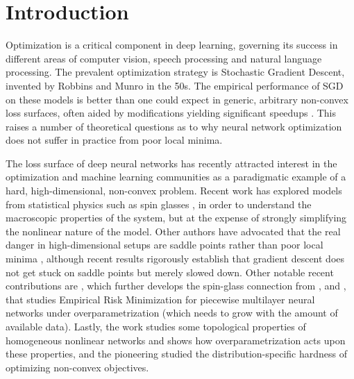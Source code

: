 \section{Introduction}
\label{sec:Intro}

%


Optimization is a critical component in deep learning, governing its success in different areas of computer vision, speech processing and natural language processing. The prevalent optimization strategy is Stochastic Gradient Descent, invented by Robbins and Munro in the 50s. The empirical performance of SGD on these models is better than one could expect in generic, arbitrary non-convex loss surfaces, often aided by modifications yielding significant speedups \cite{duchi2011adaptive, hinton2012lecture, ioffe2015batch, kingma2014adam}. This raises a number of theoretical questions as to why neural network optimization does not suffer in practice from poor local minima. 

The loss surface of deep neural networks has recently attracted interest 
in the optimization and machine learning communities as a paradigmatic example of 
a hard, high-dimensional, non-convex problem. 
Recent work has explored models from statistical physics such as spin glasses \cite{choromanska2015loss}, 
in order to understand the macroscopic properties of the system, but at the expense of strongly simplifying the nonlinear nature of the model. Other authors have advocated 
that the real danger in high-dimensional setups are saddle points 
rather than poor local minima \cite{dauphin2014identifying}, although 
recent results rigorously establish that gradient descent does not 
get stuck on saddle points \cite{lee2016gradient} but merely slowed down. 
Other notable recent contributions are \cite{kawaguchi2016deep}, which further develops the spin-glass 
connection from \cite{choromanska2015loss}, and \cite{soudry2016no}, that studies Empirical Risk Minimization for piecewise multilayer neural networks under overparametrization (which needs to grow with the amount of available data). Lastly, the work \cite{safran2015quality} studies some topological 
properties of homogeneous nonlinear networks and shows how overparametrization acts upon these properties, and the pioneering \cite{shamir2} studied the distribution-specific hardness of optimizing non-convex objectives.

